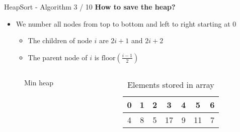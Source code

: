 
\begin{frame}{HeapSort - Algorithm 3 / 10}
  \textbf{How to save the heap?}\\[0.25em]
  \begin{itemize}
    \item
      We number all nodes from top to bottom and left to right starting at
      {\color{Mittel-Blau}0}
      \begin{itemize}
        \item
          The children of node {\color{Mittel-Blau}$i$} are
          {\color{Mittel-Blau}$2i + 1$} and {\color{Mittel-Blau}$2i + 2$}
        \vspace*{0.5em}
        \item
          The parent node of {\color{Mittel-Blau}$i$} is
          {\color{Mittel-Blau}$\mathrm{floor}\left(\frac{i-1}{2}\right)$}
      \end{itemize}
  \end{itemize}%
  \vspace*{-1.5em}%
  \begin{columns}%
    \begin{column}{0.5\textwidth}
      \begin{figure}[!h]%
        \begin{minipage}{\textwidth}%
        \end{minipage}%
        \vspace*{-0.5em}%
        \caption{Min heap}%
        \label{fig:minheap_numbered}%
      \end{figure}%
    \end{column}
    \begin{column}{0.5\textwidth}
      \begin{table}[!h]
        \caption{Elements stored in array}
        \label{tab:minheap_numbered}
        \begin{minipage}{12.97em}
          \begin{tabularx}{\textwidth}{ccccccc}
            {\color{Mittel-Gruen}0}&
            {\color{Mittel-Gruen}1}&
            {\color{Mittel-Gruen}2}&
            {\color{Mittel-Gruen}3}&
            {\color{Mittel-Gruen}4}&
            {\color{Mittel-Gruen}5}&
            {\color{Mittel-Gruen}6}\\
            \hline
            \multicolumn{1}{|c}{4}&%
            \multicolumn{1}{|c}{8}&%
            \multicolumn{1}{|c}{5}&%
            \multicolumn{1}{|c}{17}&%
            \multicolumn{1}{|c}{9}&%
            \multicolumn{1}{|c}{11}&%
            \multicolumn{1}{|c|}{7}\\
            \hline
          \end{tabularx}
        \end{minipage}
      \end{table}
    \end{column}
  \end{columns}
\end{frame}

